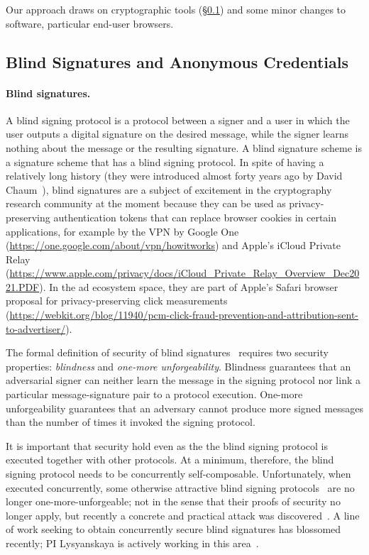 %
Our approach draws on cryptographic tools (\S\ref{s:bg-crypto}) and some minor
changes to software, particular end-user browsers.

\subsection{Blind Signatures and Anonymous Credentials}
\label{s:bg-crypto}

\paragraph{Blind signatures.} A blind signing protocol is a protocol between a signer and a user in which the user outputs a digital signature on the desired message, while the signer learns nothing about the message or the resulting signature.
A blind signature scheme is a signature scheme that has a blind signing protocol.  In spite of having a relatively long history (they were introduced almost forty years ago by David Chaum~\cite{C:Chaum82}), blind signatures are a subject of excitement in the cryptography research community at the moment because they can be used as privacy-preserving authentication tokens that can replace browser cookies in certain applications, for example by the VPN by Google One (\url{https://one.google.com/about/vpn/howitworks}) and Apple's iCloud Private Relay (\url{https://www.apple.com/privacy/docs/iCloud_Private_Relay_Overview_Dec2021.PDF}). In the ad ecosystem space, they are part of 
Apple's Safari browser proposal for privacy-preserving click measurements (\url{https://webkit.org/blog/11940/pcm-click-fraud-prevention-and-attribution-sent-to-advertiser/}).

The formal definition of security of blind signatures~\cite{JC:PoiSte00,C:JueLubOst97,RSA:AbdNamNev06,JC:SchUnr17} requires two security properties: \emph{blindness} and \emph{one-more unforgeability}. Blindness guarantees that an adversarial signer can neither learn the message in the signing protocol nor link a particular message-signature pair to a protocol execution.  One-more unforgeability guarantees that an adversary cannot produce more signed messages than the number of times it invoked the signing protocol.  

It is important that security hold even as the the blind signing protocol is executed together with other protocols.  At a minimum, therefore, the blind signing protocol needs to be concurrently self-composable.
Unfortunately, when executed concurrently, some otherwise attractive blind signing protocols~\cite{C:Okamoto92,ICICS:Schnorr01,C:AbeOka00,C:Brands93,paquin2013u-prove,CCS:BalLys13,SP:STVWJG16,cryptoeprint:2017:682,JC:GJKR07} are no longer one-more-unforgeable; not in the sense that their proofs of security no longer apply, but recently a concrete and practical attack was discovered~\cite{EC:BLLOR21}. 
A line of work seeking to obtain concurrently secure blind signatures has blossomed recently; PI Lysyanskaya is actively working in this area~\cite{}.

